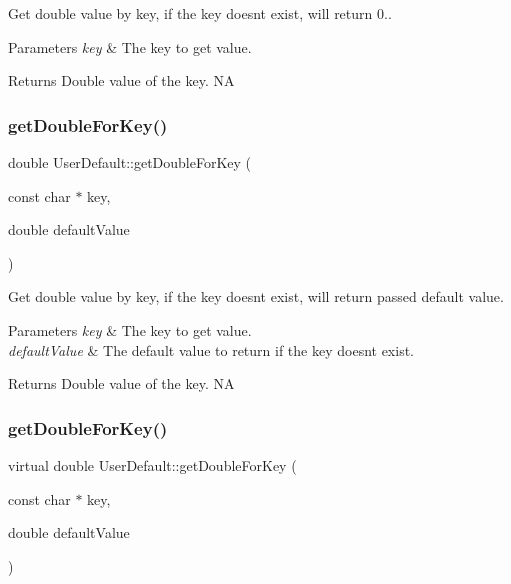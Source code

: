 Get double value by key, if the key doesn\textquotesingle{}t exist, will return 0.. 
\begin{DoxyParams}{Parameters}
{\em key} & The key to get value. \\
\hline
\end{DoxyParams}
\begin{DoxyReturn}{Returns}
Double value of the key.  NA 
\end{DoxyReturn}
\mbox{\label{classUserDefault_aa3427410ff27ebd6071c1078bfce5252}} 
\subsubsection{\texorpdfstring{get\+Double\+For\+Key()}{getDoubleForKey()}\hspace{0.1cm}{\footnotesize\ttfamily [3/4]}}
{\footnotesize\ttfamily double User\+Default\+::get\+Double\+For\+Key (\begin{DoxyParamCaption}\item[{const char $\ast$}]{key,  }\item[{double}]{default\+Value }\end{DoxyParamCaption})\hspace{0.3cm}{\ttfamily [virtual]}}

Get double value by key, if the key doesn\textquotesingle{}t exist, will return passed default value. 
\begin{DoxyParams}{Parameters}
{\em key} & The key to get value. \\
\hline
{\em default\+Value} & The default value to return if the key doesn\textquotesingle{}t exist. \\
\hline
\end{DoxyParams}
\begin{DoxyReturn}{Returns}
Double value of the key.  NA 
\end{DoxyReturn}
\mbox{\label{classUserDefault_ae685a6633747ecfc3c9dedd5306b219e}} 
\subsubsection{\texorpdfstring{get\+Double\+For\+Key()}{getDoubleForKey()}\hspace{0.1cm}{\footnotesize\ttfamily [4/4]}}
{\footnotesize\ttfamily virtual double User\+Default\+::get\+Double\+For\+Key (\begin{DoxyParamCaption}\item[{const char $\ast$}]{key,  }\item[{double}]{default\+Value }\end{DoxyParamCaption})\hspace{0.3cm}{\ttfamily [virtual]}}

